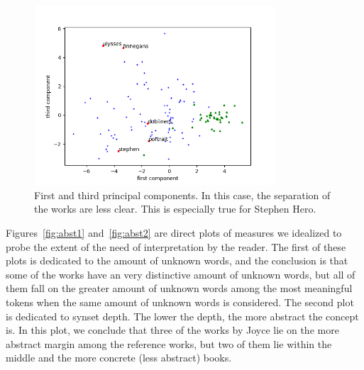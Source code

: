 \documentclass[12pt,fleqn]{article}
\begin{document}
\begin{figure}[!htbp] %
\vspace{-2pt}
\begin{center}
\includegraphics[height=6.7cm,width=9cm]{figs/pca2}%
\caption{First and third principal components.
    In this case, the separation of the works are less clear.
    This is especially true for Stephen Hero.}
\label{fig:pca2}%
\end{center}
\end{figure}


Figures~\ref{fig:abst1} and~\ref{fig:abst2} are direct plots of measures
we idealized to probe the extent of the need of interpretation by the reader.
The first of these plots is dedicated to the amount of unknown words,
and the conclusion is that some of the works have an very distinctive amount
of unknown words, but all of them fall on the greater amount of unknown words
among the most meaningful tokens when the same amount of unknown words is considered.
The second plot is dedicated to synset depth.
The lower the depth, the more abstract the concept is.
In this plot, we conclude that three of the works by Joyce lie on
the more abstract margin among the reference works,
but two of them lie within the middle and the more concrete (less abstract)
books.
\end{document}
